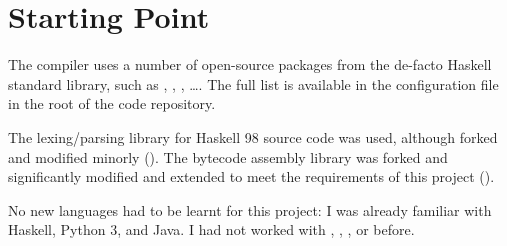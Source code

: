 \documentclass[dissertation.tex]{subfiles}
\begin{document}
\section{Starting Point}\label{sec:starting-point}
{

    The compiler uses a number of open-source packages from the de-facto Haskell standard library, such as
    , , , \dots. The full list is available in the
     configuration file in the root of the code repository.

    The  lexing/parsing library for Haskell 98 source code was used, although forked and modified
    minorly (). The bytecode assembly library  was forked and significantly
    modified and extended to meet the requirements of this project ().

    No new languages had to be learnt for this project: I was already familiar with Haskell, Python 3, and Java. I had
    not worked with , , , or  before.

}
\end{document}
